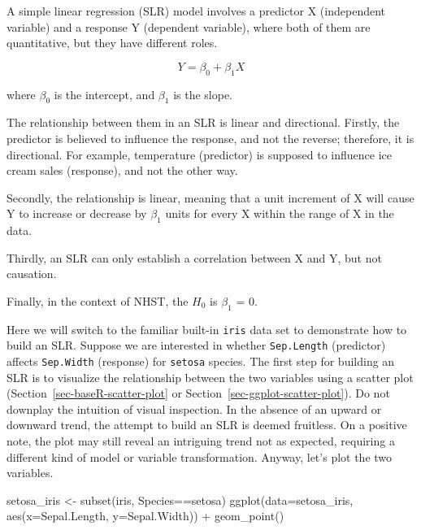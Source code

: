 \documentclass[
  letterpaper,
  DIV=11,
  numbers=noendperiod]{scrreprt}
\newenvironment{Shaded}{\begin{snugshade}}{\end{snugshade}}
\newcommand{\AttributeTok}[1]{\textcolor[rgb]{0.40,0.45,0.13}{#1}}
\newcommand{\FunctionTok}[1]{\textcolor[rgb]{0.28,0.35,0.67}{#1}}
\newcommand{\NormalTok}[1]{\textcolor[rgb]{0.00,0.23,0.31}{#1}}
\newcommand{\OtherTok}[1]{\textcolor[rgb]{0.00,0.23,0.31}{#1}}
\newcommand{\SpecialCharTok}[1]{\textcolor[rgb]{0.37,0.37,0.37}{#1}}
\newcommand{\StringTok}[1]{\textcolor[rgb]{0.13,0.47,0.30}{#1}}
\begin{document}
A simple linear regression (SLR) model involves a predictor X
(independent variable) and a response Y (dependent variable), where both
of them are quantitative, but they have different roles.

\[Y = \beta_{0} + \beta_{1}X\]

where \(\beta_{0}\) is the intercept, and \(\beta_{1}\) is the slope.

The relationship between them in an SLR is linear and directional.
Firstly, the predictor is believed to influence the response, and not
the reverse; therefore, it is directional. For example, temperature
(predictor) is supposed to influence ice cream sales (response), and not
the other way.

Secondly, the relationship is linear, meaning that a unit increment of X
will cause Y to increase or decrease by \(\beta_{1}\) units for every X
within the range of X in the data.

Thirdly, an SLR can only establish a correlation between X and Y, but
not causation.

Finally, in the context of NHST, the \(H_{0}\) is \(\beta_{1}\) = 0.

Here we will switch to the familiar built-in \texttt{iris} data set to
demonstrate how to build an SLR. Suppose we are interested in whether
\texttt{Sep.Length} (predictor) affects \texttt{Sep.Width} (response)
for \texttt{setosa} species. The first step for building an SLR is to
visualize the relationship between the two variables using a scatter
plot (Section~\ref{sec-baseR-scatter-plot} or
Section~\ref{sec-ggplot-scatter-plot}). Do not downplay the intuition of
visual inspection. In the absence of an upward or downward trend, the
attempt to build an SLR is deemed fruitless. On a positive note, the
plot may still reveal an intriguing trend not as expected, requiring a
different kind of model or variable transformation. Anyway, let's plot
the two variables.

\begin{Shaded}
\begin{Highlighting}[]
\NormalTok{setosa\_iris }\OtherTok{\textless{}{-}} \FunctionTok{subset}\NormalTok{(iris, Species}\SpecialCharTok{==}\StringTok{\textquotesingle{}setosa\textquotesingle{}}\NormalTok{)}
\FunctionTok{ggplot}\NormalTok{(}\AttributeTok{data=}\NormalTok{setosa\_iris, }\FunctionTok{aes}\NormalTok{(}\AttributeTok{x=}\NormalTok{Sepal.Length, }\AttributeTok{y=}\NormalTok{Sepal.Width)) }\SpecialCharTok{+}
  \FunctionTok{geom\_point}\NormalTok{()}
\end{Highlighting}
\end{Shaded}
\end{document}

